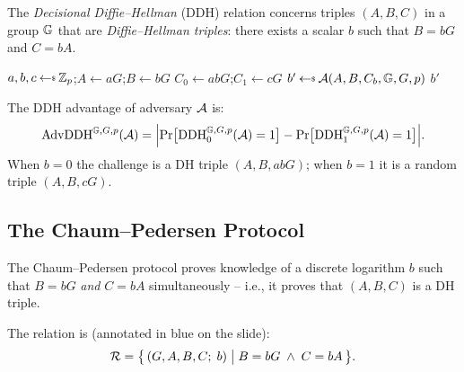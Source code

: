 \documentclass[11pt]{article}
\begin{document}
The \emph{Decisional Diffie--Hellman} (DDH) relation concerns triples $(A, B, C)$ in a group $\mathbb{G}$ that are \emph{Diffie--Hellman triples}: there exists a scalar $b$ such that $B = bG$ and $C = bA$.

\begin{tcolorbox}[colback=yellow!8!white, colframe=orange!80!black,
                  title={DDH Problem (game formulation)}]
\begin{algorithmic}[1]
    \State $a, b, c \getsr \Zp$;\quad $A \leftarrow aG$;\quad $B \leftarrow bG$
    \State $C_0 \leftarrow abG$;\quad $C_1 \leftarrow cG$
    \State $b' \getsr \advA(A, B, C_b, \G, G, p)$
    \State \Return $b'$
  \EndProcedure
\end{algorithmic}
\medskip
The DDH advantage of adversary $\mathcal{A}$ is:
\[
  \mathrm{AdvDDH}^{\mathbb{G},G,p}(\mathcal{A})
  = \Bigl|\Pr\bigl[\mathrm{DDH}_0^{\mathbb{G},G,p}(\mathcal{A})=1\bigr]
    - \Pr\bigl[\mathrm{DDH}_1^{\mathbb{G},G,p}(\mathcal{A})=1\bigr]\Bigr|.
\]
When $b=0$ the challenge is a DH triple $(A,B,abG)$; when $b=1$ it is a random triple $(A,B,cG)$.
\end{tcolorbox}

\subsection{The Chaum--Pedersen Protocol}

The Chaum--Pedersen protocol proves knowledge of a discrete logarithm $b$ such that $B = bG$ \emph{and} $C = bA$ simultaneously -- i.e., it proves that $(A,B,C)$ is a DH triple.

\medskip
The relation is (annotated in blue on the slide):
\[
  \mathcal{R} = \bigl\{\,(G, A, B, C;\; b) \;\big|\; B = bG \;\wedge\; C = bA\,\bigr\}.
\]
\end{document}
